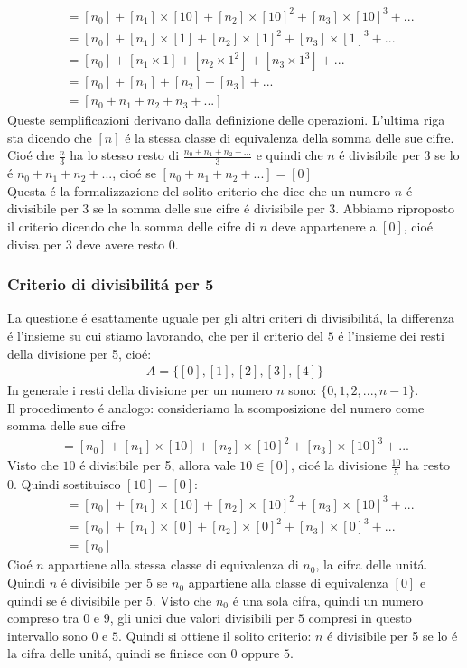 \documentclass[twoside]{article} %
\begin{document}
	\begin{align*}
		[n]&=[n_0]+[n_1]\times [10]+[n_2]\times [10]^2+[n_3]\times [10]^3+...\\
		&=[n_0]+[n_1]\times [1]+[n_2]\times [1]^2+[n_3]\times [1]^3+...\\
		&=[n_0]+[n_1\times 1]+[n_2\times 1^2]+[n_3\times 1^3]+...\\
		&=[n_0]+[n_1]+[n_2]+[n_3]+...\\
		&=[n_0+n_1+n_2+n_3+...]
	\end{align*}	
	Queste semplificazioni derivano dalla definizione delle operazioni. L'ultima riga sta dicendo che $[n]$ \'e la stessa classe di equivalenza della somma delle sue cifre. Cio\'e che $\frac{n}{3}$ ha lo stesso resto di $\frac{n_0+n_1+n_2+...}{3}$ e quindi che $n$ \'e divisibile per 3 se lo \'e $n_0+n_1+n_2+...$, cio\'e se $[n_0+n_1+n_2+...]=[0]$\\
	Questa \'e la formalizzazione del solito criterio che dice che un numero $n$ \'e divisibile per 3 se la somma delle sue cifre \'e divisibile per 3. Abbiamo riproposto il criterio dicendo che la somma delle cifre di $n$ deve appartenere a $[0]$, cio\'e divisa per 3 deve avere resto 0.
	\newpage
	\subsubsection{Criterio di divisibilit\'a per 5}
	La questione \'e esattamente uguale per gli altri criteri di divisibilit\'a, la differenza \'e l'insieme su cui stiamo lavorando, che per il criterio del $5$ \'e l'insieme dei resti della divisione per 5, cio\'e:
	\begin{gather*}
		A=\{[0],[1],[2],[3],[4]\}
	\end{gather*}
	In generale i resti della divisione per un numero $n$ sono: $\{0,1,2,...,n-1\}$.\\
	Il procedimento \'e analogo: consideriamo la scomposizione del numero come somma delle sue cifre
	\begin{align*}
		[n]=[n_0]+[n_1]\times [10]+[n_2]\times [10]^2+[n_3]\times [10]^3+...
	\end{align*}	
	Visto che $10$ \'e divisibile per 5, allora vale $10\in [0]$, cio\'e la divisione $\frac{10}{5}$ ha resto 0. Quindi sostituisco $[10]=[0]$:	
	\begin{align*}
		[n]&=[n_0]+[n_1]\times [10]+[n_2]\times [10]^2+[n_3]\times [10]^3+...\\
		&=[n_0]+[n_1]\times [0]+[n_2]\times [0]^2+[n_3]\times [0]^3+...\\
		&=[n_0]
	\end{align*}
	Cio\'e $n$ appartiene alla stessa classe di equivalenza di $n_0$, la cifra delle unit\'a. Quindi $n$ \'e divisibile per 5 se $n_0$ appartiene alla classe di equivalenza  $[0]$ e quindi se \'e divisibile per 5. Visto che $n_0$ \'e una sola cifra, quindi un numero compreso tra $0$ e $9$, gli unici due valori divisibili per $5$ compresi in questo intervallo sono $0$ e $5$. Quindi si ottiene il solito criterio: $n$ \'e divisibile per 5 se lo \'e la cifra delle unit\'a, quindi se finisce con $0$ oppure $5$.
	\newpage
\end{document}
